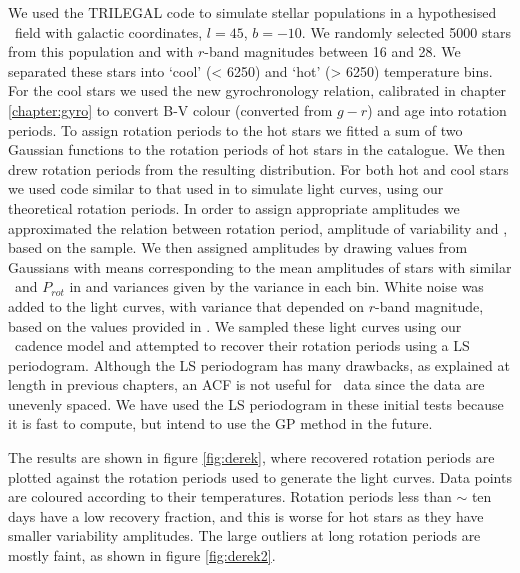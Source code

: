 We used the TRILEGAL \citep{Girardi2012} code to simulate stellar populations
in a hypothesised \LSST\ field with galactic coordinates, $l = 45$, $b = -10$.
We randomly selected 5000 stars from this population and with $r$-band
magnitudes between 16 and 28.
We separated these stars into `cool' (< 6250) and `hot' (> 6250) temperature
bins.
For the cool stars we used the new gyrochronology relation, calibrated in
chapter \ref{chapter:gyro} to convert B-V colour (converted from $g-r$) and
age into rotation periods.
To assign rotation periods to the hot stars we fitted a sum of two Gaussian
functions to the rotation periods of hot stars in the \citet{Mcquillan2014}
catalogue.
We then drew rotation periods from the resulting distribution.
For both hot and cool stars we used code similar to that used in
\citet{Aigrain2015} to simulate light curves, using our theoretical rotation
periods.
In order to assign appropriate amplitudes we approximated the relation between
rotation period, amplitude of variability and \teff, based on the
\citet{Mcquillan2014} sample.
We then assigned amplitudes by drawing values from Gaussians with means
corresponding to the mean amplitudes of stars with similar \teff\ and
$P_{rot}$ in \citet{Mcquillan2014} and variances given by the variance in each
bin.
White noise was added to the light curves, with variance that depended on
$r$-band magnitude, based on the values provided in \citet{Jacklin2015}.
We sampled these light curves using our \LSST\ cadence model and attempted to
recover their rotation periods using a LS periodogram.
Although the LS periodogram has many drawbacks, as explained at length in
previous chapters, an ACF is not useful for \LSST\ data since the data are
unevenly spaced.
We have used the LS periodogram in these initial tests because it is fast to
compute, but intend to use the GP method in the future.

The results are shown in figure \ref{fig:derek}, where recovered rotation
periods are plotted against the rotation periods used to generate the light
curves.
Data points are coloured according to their temperatures.
Rotation periods less than $\sim$ ten days have a low recovery fraction, and
this is worse for hot stars as they have smaller variability amplitudes.
The large outliers at long rotation periods are mostly faint, as shown in
figure \ref{fig:derek2}.

